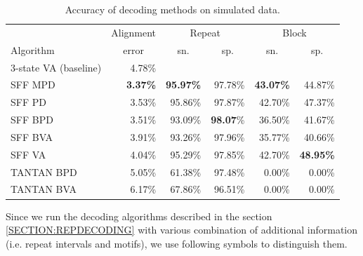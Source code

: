 \def\M{$^\circ$} %
\def\MM{$^{\circ\circ\circ}$} %
\def\D{$^{\circ\circ}$} %
\def\DD{$^{\dagger}$} %
\def\R{$^{\yen}$}
\def\RR{$^{\yen\yen}$}
\def\CC#1{\multicolumn{1}{c}{#1}} %
\def\S{$^{\star}$}

\begin{table}
\begin{center}
\begin{tabular}{lr@{\quad}rr@{\quad}rr}
\hline
          & \CC{Alignment} & \multicolumn{2}{c}{Repeat} & 
\multicolumn{2}{c}{Block}\\
Algorithm & \CC{error} & \CC{sn.} & \CC{sp.} & \CC{sn.} & \CC{sp.} \\
\hline
\hline
3-state VA (baseline)    & 4.78\% \\
\hline
SFF MPD   & {\bf 3.37\%} & {\bf 95.97\%} & 97.78\% & {\bf 43.07\%} & 44.87\%\\
SFF PD    & 3.53\% & 95.86\% & 97.87\% & 42.70\% & 47.37\%\\
SFF BPD   & 3.51\% & 93.09\% & {\bf 98.07}\% & 36.50\% & 41.67\%\\
SFF BVA   & 3.91\% & 93.26\% & 97.96\% & 35.77\% & 40.66\%\\
SFF VA    & 4.04\% & 95.29\% & 97.85\% & 42.70\% & {\bf 48.95\%}\\
TANTAN BPD& 5.05\% & 61.38\% & 97.48\% & 0.00\% & 0.00\%\\
TANTAN BVA& 6.17\% & 67.86\% & 96.51\% & 0.00\% & 0.00\%\\
\hline
\end{tabular}
\end{center}
\caption{Accuracy of decoding methods on simulated data.}\label{TABLE:SFFMAIN}
\end{table}

Since we run the decoding algorithms described in the section
\ref{SECTION:REPDECODING} with various combination of additional information
(i.e. repeat intervals and motifs), we use following symbols to
distinguish them.

